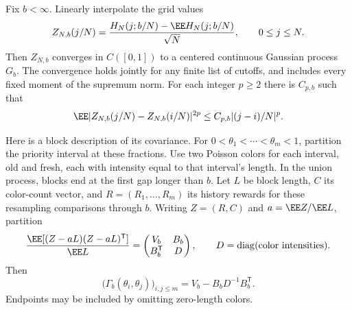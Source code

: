 \documentclass[11pt,letterpaper]{article}
\begin{document}
\begin{lemma}
\label{lem:dense-cutoff-process}
Fix $b<\infty$. Linearly interpolate the grid values
\[
 Z_{N,b}(j/N)=
   \frac{H_N(j;b/N)-\EE H_N(j;b/N)}{\sqrt N},
                    \qquad 0\le j\le N.
\]
Then $Z_{N,b}$ converges in $C([0,1])$ to a centered
continuous Gaussian process $G_b$. The convergence holds
jointly for any finite list of cutoffs, and includes
every fixed moment of the supremum norm.
For each integer $p\ge2$ there is $C_{p,b}$ such that
\begin{equation}\label{eq:dense-cutoff-index-moment}
 \EE|Z_{N,b}(j/N)-Z_{N,b}(i/N)|^{2p}
                   \le C_{p,b}|(j-i)/N|^p.
\end{equation}

Here is a block description of its covariance.
For $0<\theta_1<\cdots<\theta_m<1$, partition the priority
interval at these fractions. Use two Poisson colors for
each interval, old and fresh, each with intensity equal
to that interval's length. In the union process, blocks
end at the first gap longer than $b$.
Let $L$ be block length, $C$ its color-count vector, and
$R=(R_1,\ldots,R_m)$ its history rewards for these
resampling comparisons through $b$.
Writing $Z=(R,C)$ and $a=\EE Z/\EE L$, partition
\[
 \frac{\EE[(Z-aL)(Z-aL)^{\mathsf T}]}{\EE L}
       =\begin{pmatrix}V_b&B_b\\B_b^{\mathsf T}&D\end{pmatrix},
 \qquad D=\operatorname{diag}(\text{color intensities}).
\]
Then
\begin{equation}\label{eq:dense-process-kernel}
 \big(\Gamma_b(\theta_i,\theta_j)\big)_{i,j\le m}
                 =V_b-B_bD^{-1}B_b^{\mathsf T}.
\end{equation}
Endpoints may be included by omitting zero-length colors.
\end{lemma}
\end{document}

